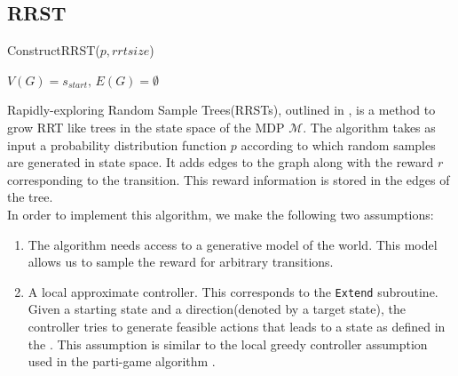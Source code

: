 \documentclass[wcp]{jmlr}
\begin{document}
\subsection*{RRST}
\begin{algorithm2e}
\caption{ConstructRRST($p,rrtsize$)}
\label{alg:rrst}
\dontprintsemicolon
$V(G)=s_{start},\,E(G)=\emptyset$\;
\end{algorithm2e}
Rapidly-exploring Random Sample Trees(RRSTs), outlined in , is a method to grow RRT like trees in the state space of the MDP $\mathcal{M}$.  The algorithm takes as input a probability distribution function $p$ according to which random samples are generated in state space. It adds edges to the graph along with the reward $r$ corresponding to the transition. This reward information is stored in the edges of the tree.\\

In order to implement this algorithm, we make the following two assumptions:
\begin{enumerate}
\item The algorithm needs access to a generative model of the world. This model allows us to sample the reward for arbitrary transitions.
\item A local approximate controller. This corresponds to the \texttt{Extend} subroutine. Given a starting state and a direction(denoted by a target state), the controller tries to generate feasible actions that leads to a state as defined in the . This assumption is similar to the local greedy controller assumption used in the parti-game algorithm \citep{partigame}.
\end{enumerate}
\end{document}
